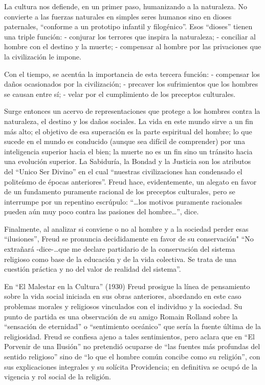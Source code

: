 \documentclass[
]{book}
\begin{document}
La cultura nos defiende, en un primer paso, humanizando a la naturaleza. No convierte a las fuerzas naturales en simples seres humanos sino en dioses paternales, ``conforme a un prototipo infantil y filogénico''. Esos ``dioses'' tienen una triple función: - conjurar los terrores que inspira la naturaleza; - conciliar al hombre con el destino y la muerte; - compensar al hombre por las privaciones que la civilización le impone.

Con el tiempo, se acentúa la importancia de esta tercera función: - compensar los daños ocasionados por la civilización; - precaver los sufrimientos que los hombres se causan entre sí; - velar por el cumplimiento de los preceptos culturales.

Surge entonces un acervo de representaciones que protege a los hombres contra la naturaleza, el destino y los daños sociales. La vida en este mundo sirve a un fin más alto; el objetivo de esa superación es la parte espiritual del hombre; lo que sucede en el mundo es conducido (aunque sea difícil de comprender) por una inteligencia superior hacia el bien; la muerte no es un fin sino un tránsito hacia una evolución superior. La Sabiduría, la Bondad y la Justicia son los atributos del ``Unico Ser Divino'' en el cual ``nuestras civilizaciones han condensado el politeísmo de épocas anteriores''. Freud hace, evidentemente, un alegato en favor de un fundamento puramente racional de los preceptos culturales, pero se interrumpe por un repentino escrúpulo: ``\ldots los motivos puramente racionales pueden aún muy poco contra las pasiones del hombre\ldots{}'', dice.

Finalmente, al analizar si conviene o no al hombre y a la sociedad perder esas ``ilusiones'', Freud se pronuncia decididamente en favor de su conservación" ``No extrañará -dice-\ldots que me declare partidario de la conservación del sistema religioso como base de la educación y de la vida colectiva. Se trata de una cuestión práctica y no del valor de realidad del sistema''.

En ``El Malestar en la Cultura'' (1930) Freud prosigue la línea de pensamiento sobre la vida social iniciada en sus obras anteriores, abordando en este caso problemas morales y religiosos vinculados con el individuo y la sociedad. Su punto de partida es una observación de su amigo Romain Rolland sobre la ``sensación de eternidad'' o ``sentimiento oceánico'' que sería la fuente última de la religiosidad. Freud se confiesa ajeno a tales sentimientos, pero aclara que en ``El Porvenir de una Ilusión'' no pretendió ocuparse de ``las fuentes más profundas del sentido religioso'' sino de ``lo que el hombre común concibe como su religión'', con sus explicaciones integrales y su solícita Providencia; en definitiva se ocupó de la vigencia y rol social de la religión.
\end{document}
